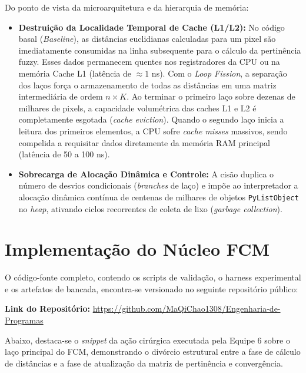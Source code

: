 \documentclass[11pt,a4paper]{article}
\begin{document}
Do ponto de vista da microarquitetura e da hierarquia de mem\'{o}ria:
\begin{itemize}
    \item \textbf{Destrui\c{c}\~{a}o da Localidade Temporal de Cache (L1/L2):} No c\'{o}digo basal (\textit{Baseline}), as dist\^{a}ncias euclidianas calculadas para um pixel s\~{a}o imediatamente consumidas na linha subsequente para o c\'{a}lculo da pertin\^{e}ncia fuzzy. Esses dados permanecem quentes nos registradores da CPU ou na mem\'{o}ria Cache L1 (lat\^{e}ncia de $\approx 1$ ns). Com o \textit{Loop Fission}, a separa\c{c}\~{a}o dos la\c{c}os for\c{c}a o armazenamento de todas as dist\^{a}ncias em uma matriz intermedi\'{a}ria de ordem $n \times K$. Ao terminar o primeiro la\c{c}o sobre dezenas de milhares de pixels, a capacidade volum\'{e}trica das caches L1 e L2 \'{e} completamente esgotada (\textit{cache eviction}). Quando o segundo la\c{c}o inicia a leitura dos primeiros elementos, a CPU sofre \textit{cache misses} massivos, sendo compelida a requisitar dados diretamente da mem\'{o}ria RAM principal (lat\^{e}ncia de 50 a 100 ns).
    \item \textbf{Sobrecarga de Aloca\c{c}\~{a}o Din\^{a}mica e Controle:} A cis\~{a}o duplica o n\'{u}mero de desvios condicionais (\textit{branches} de la\c{c}o) e imp\~{o}e ao interpretador a aloca\c{c}\~{a}o din\^{a}mica cont\'{i}nua de centenas de milhares de objetos \texttt{PyListObject} no \textit{heap}, ativando ciclos recorrentes de coleta de lixo (\textit{garbage collection}).
\end{itemize}

\section{Implementa\c{c}\~{a}o do N\'{u}cleo FCM}
O c\'{o}digo-fonte completo, contendo os scripts de valida\c{c}\~{a}o, o harness experimental e os artefatos de bancada, encontra-se versionado no seguinte reposit\'{o}rio p\'{u}blico:

\noindent\textbf{Link do Reposit\'{o}rio:} \url{https://github.com/MaQiChao1308/Engenharia-de-Programas}

Abaixo, destaca-se o \textit{snippet} da a\c{c}\~{a}o cir\'{u}rgica executada pela Equipe 6 sobre o la\c{c}o principal do FCM, demonstrando o div\'{o}rcio estrutural entre a fase de c\'{a}lculo de dist\^{a}ncias e a fase de atualiza\c{c}\~{a}o da matriz de pertin\^{e}ncia e converg\^{e}ncia.
\end{document}
